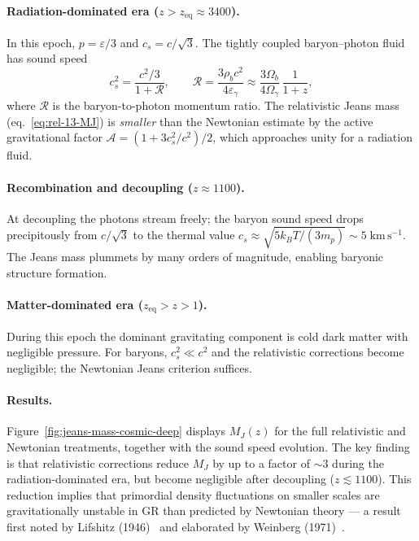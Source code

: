 \paragraph{Radiation-dominated era ($z > z_{\mathrm{eq}} \approx 3400$).}
In this epoch, $p = \varepsilon/3$ and $c_{s} = c/\sqrt{3}$.  The
tightly coupled baryon--photon fluid has sound speed
\begin{equation}
\label{eq:rel-13-cs-rad}
c_{s}^{2} = \frac{c^{2}/3}{1 + \mathcal{R}},
\qquad
\mathcal{R} = \frac{3\rho_{b}c^{2}}{4\varepsilon_{\gamma}}
  \approx \frac{3\Omega_{b}}{4\Omega_{\gamma}}\,\frac{1}{1+z},
\end{equation}
where $\mathcal{R}$ is the baryon-to-photon momentum ratio.
The relativistic Jeans mass (eq.~\eqref{eq:rel-13-MJ}) is
\emph{smaller} than the Newtonian estimate by the active gravitational
factor $\mathcal{A} = (1 + 3c_{s}^{2}/c^{2})/2$, which approaches
unity for a radiation fluid.

\paragraph{Recombination and decoupling ($z \approx 1100$).}
At decoupling the photons stream freely; the baryon sound speed drops
precipitously from $c/\sqrt{3}$ to the thermal value
$c_{s} \approx \sqrt{5k_{B}T/(3m_{p})} \sim 5\;\mathrm{km\,s^{-1}}$.
The Jeans mass plummets by many orders of magnitude, enabling
baryonic structure formation.

\paragraph{Matter-dominated era ($z_{\mathrm{eq}} > z > 1$).}
During this epoch the dominant gravitating component is cold dark
matter with negligible pressure.  For baryons, $c_{s}^{2} \ll c^{2}$
and the relativistic corrections become negligible; the Newtonian
Jeans criterion suffices.

\paragraph{Results.}
Figure~\ref{fig:jeans-mass-cosmic-deep} displays $M_{J}(z)$ for the
full relativistic and Newtonian treatments, together with the sound
speed evolution.  The key finding is that relativistic corrections
reduce $M_{J}$ by up to a factor of $\sim 3$ during the
radiation-dominated era, but become negligible after decoupling
($z \lesssim 1100$).  This reduction implies that primordial density
fluctuations on smaller scales are gravitationally unstable in GR
than predicted by Newtonian theory --- a result first noted by
Lifshitz (1946)~\citep{Lifshitz1946} and elaborated by
Weinberg (1971)~\citep{Weinberg1971}.

